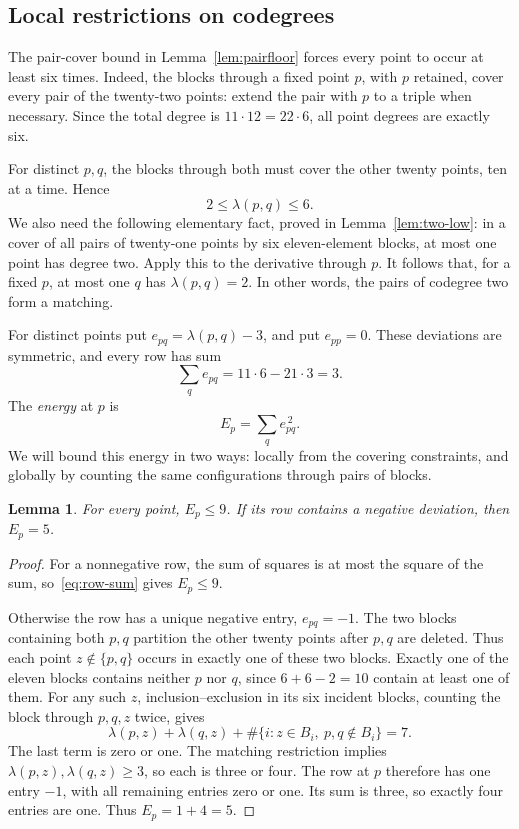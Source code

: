 \documentclass[11pt,letterpaper]{article}
\newtheorem{lemma}[theorem]{Lemma}
\theoremstyle{definition}\newtheorem{definition}[theorem]{Definition}
\theoremstyle{remark}\newtheorem{remark}[theorem]{Remark}
\newcommand{\lam}{\lambda}
\begin{document}
\subsection{Local restrictions on codegrees}
The pair-cover bound in Lemma~\ref{lem:pairfloor} forces every point to occur at least six times. Indeed, the blocks through a fixed point $p$, with $p$ retained, cover every pair of the twenty-two points: extend the pair with $p$ to a triple when necessary. Since the total degree is $11\cdot12=22\cdot6$, all point degrees are exactly six.

For distinct $p,q$, the blocks through both must cover the other twenty points, ten at a time. Hence
\[
 2\le\lam(p,q)\le6.
\]
We also need the following elementary fact, proved in Lemma~\ref{lem:two-low}: in a cover of all pairs of twenty-one points by six eleven-element blocks, at most one point has degree two. Apply this to the derivative through $p$. It follows that, for a fixed $p$, at most one $q$ has $\lam(p,q)=2$. In other words, the pairs of codegree two form a matching.

For distinct points put $e_{pq}=\lam(p,q)-3$, and put $e_{pp}=0$. These deviations are symmetric, and every row has sum
\begin{equation}\label{eq:row-sum}
 \sum_q e_{pq}=11\cdot6-21\cdot3=3.
\end{equation}
The \emph{energy} at $p$ is
\[
 E_p=\sum_q e_{pq}^{\,2}.
\]
We will bound this energy in two ways: locally from the covering constraints, and globally by counting the same configurations through pairs of blocks.

\begin{lemma}\label{lem:rowenergy}
For every point, $E_p\le9$. If its row contains a negative deviation, then $E_p=5$.
\end{lemma}
\begin{proof}
For a nonnegative row, the sum of squares is at most the square of the sum, so~\eqref{eq:row-sum} gives $E_p\le9$.

Otherwise the row has a unique negative entry, $e_{pq}=-1$. The two blocks containing both $p,q$ partition the other twenty points after $p,q$ are deleted. Thus each point $z\notin\{p,q\}$ occurs in exactly one of these two blocks. Exactly one of the eleven blocks contains neither $p$ nor $q$, since $6+6-2=10$ contain at least one of them. For any such $z$, inclusion--exclusion in its six incident blocks, counting the block through $p,q,z$ twice, gives
\[
 \lam(p,z)+\lam(q,z)
 +\#\{i:z\in B_i,\ p,q\notin B_i\}=7.
\]
The last term is zero or one. The matching restriction implies $\lam(p,z),\lam(q,z)\ge3$, so each is three or four. The row at $p$ therefore has one entry $-1$, with all remaining entries zero or one. Its sum is three, so exactly four entries are one. Thus $E_p=1+4=5$.
\end{proof}
\end{document}
